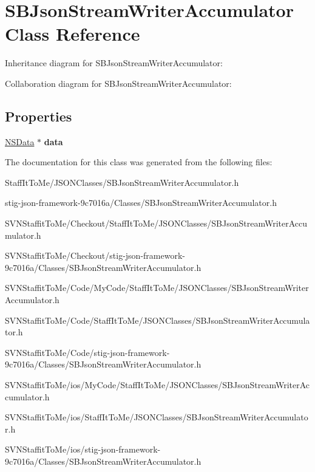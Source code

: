 \hypertarget{interface_s_b_json_stream_writer_accumulator}{
\section{\-S\-B\-Json\-Stream\-Writer\-Accumulator \-Class \-Reference}
\label{interface_s_b_json_stream_writer_accumulator}
}


\-Inheritance diagram for \-S\-B\-Json\-Stream\-Writer\-Accumulator\-:


\-Collaboration diagram for \-S\-B\-Json\-Stream\-Writer\-Accumulator\-:
\subsection*{\-Properties}
\begin{DoxyCompactItemize}
\item 
\hypertarget{interface_s_b_json_stream_writer_accumulator_a6741520ae1971defd56670b9482f17ec}{
\hyperlink{class_n_s_data}{\-N\-S\-Data} $\ast$ {\bfseries data}}
\label{interface_s_b_json_stream_writer_accumulator_a6741520ae1971defd56670b9482f17ec}

\end{DoxyCompactItemize}


\-The documentation for this class was generated from the following files\-:\begin{DoxyCompactItemize}
\item 
\-Staff\-It\-To\-Me/\-J\-S\-O\-N\-Classes/\-S\-B\-Json\-Stream\-Writer\-Accumulator.\-h\item 
stig-\/json-\/framework-\/9c7016a/\-Classes/\-S\-B\-Json\-Stream\-Writer\-Accumulator.\-h\item 
\-S\-V\-N\-Staffit\-To\-Me/\-Checkout/\-Staff\-It\-To\-Me/\-J\-S\-O\-N\-Classes/\-S\-B\-Json\-Stream\-Writer\-Accumulator.\-h\item 
\-S\-V\-N\-Staffit\-To\-Me/\-Checkout/stig-\/json-\/framework-\/9c7016a/\-Classes/\-S\-B\-Json\-Stream\-Writer\-Accumulator.\-h\item 
\-S\-V\-N\-Staffit\-To\-Me/\-Code/\-My\-Code/\-Staff\-It\-To\-Me/\-J\-S\-O\-N\-Classes/\-S\-B\-Json\-Stream\-Writer\-Accumulator.\-h\item 
\-S\-V\-N\-Staffit\-To\-Me/\-Code/\-Staff\-It\-To\-Me/\-J\-S\-O\-N\-Classes/\-S\-B\-Json\-Stream\-Writer\-Accumulator.\-h\item 
\-S\-V\-N\-Staffit\-To\-Me/\-Code/stig-\/json-\/framework-\/9c7016a/\-Classes/\-S\-B\-Json\-Stream\-Writer\-Accumulator.\-h\item 
\-S\-V\-N\-Staffit\-To\-Me/ios/\-My\-Code/\-Staff\-It\-To\-Me/\-J\-S\-O\-N\-Classes/\-S\-B\-Json\-Stream\-Writer\-Accumulator.\-h\item 
\-S\-V\-N\-Staffit\-To\-Me/ios/\-Staff\-It\-To\-Me/\-J\-S\-O\-N\-Classes/\-S\-B\-Json\-Stream\-Writer\-Accumulator.\-h\item 
\-S\-V\-N\-Staffit\-To\-Me/ios/stig-\/json-\/framework-\/9c7016a/\-Classes/\-S\-B\-Json\-Stream\-Writer\-Accumulator.\-h\end{DoxyCompactItemize}
